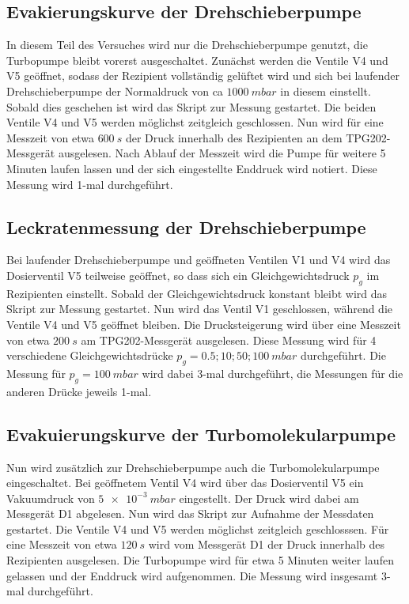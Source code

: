 \subsection{Evakierungskurve der Drehschieberpumpe}
In diesem Teil des Versuches wird nur die Drehschieberpumpe genutzt, die Turbopumpe bleibt vorerst ausgeschaltet.
Zunächst werden die Ventile V4 und V5 geöffnet, sodass der Rezipient vollständig gelüftet wird und sich bei laufender Drehschieberpumpe der Normaldruck von ca $\SI{1000}{mbar}$
in diesem einstellt.
Sobald dies geschehen ist wird das Skript zur Messung gestartet. Die beiden Ventile V4 und V5 werden möglichst zeitgleich geschlossen. Nun wird für eine Messzeit von etwa $\SI{600}{s}$
der Druck innerhalb des Rezipienten an dem TPG202-Messgerät ausgelesen. Nach Ablauf der Messzeit wird die Pumpe für weitere 5 Minuten laufen lassen und der sich eingestellte Enddruck
wird notiert. Diese Messung wird 1-mal durchgeführt.

\subsection{Leckratenmessung der Drehschieberpumpe}
Bei laufender Drehschieberpumpe und geöffneten Ventilen V1 und V4 wird das Dosierventil V5 teilweise geöffnet, so dass sich ein Gleichgewichtsdruck $p_{\mathit{g}}$ im Rezipienten einstellt.
Sobald der Gleichgewichtsdruck konstant bleibt wird das Skript zur Messung gestartet. Nun wird das Ventil V1 geschlossen, während die Ventile V4 und V5
geöffnet bleiben. Die Drucksteigerung wird über eine Messzeit von etwa $\SI{200}{s}$ am TPG202-Messgerät ausgelesen. Diese Messung wird für 4 verschiedene Gleichgewichtsdrücke
$p_{\mathit{g}} = 0.5; 10; 50; \SI{100}{mbar}$ durchgeführt. Die Messung für $p_{\mathit{g}} = \SI{100}{mbar}$ wird dabei 3-mal durchgeführt, die Messungen für die anderen Drücke jeweils 1-mal.

\subsection{Evakuierungskurve der Turbomolekularpumpe}
Nun wird zusätzlich zur Drehschieberpumpe auch die Turbomolekularpumpe eingeschaltet. Bei geöffnetem Ventil V4 wird über das Dosierventil V5 ein Vakuumdruck von $\SI{5e-3}{mbar}$ eingestellt.
Der Druck wird dabei am Messgerät D1 abgelesen.
Nun wird das Skript zur Aufnahme der Messdaten gestartet. Die Ventile V4 und V5 werden möglichst zeitgleich geschlosssen. Für eine Messzeit von etwa $\SI{120}{s}$ wird vom Messgerät
D1 der Druck innerhalb des Rezipienten ausgelesen. Die Turbopumpe wird für etwa 5 Minuten weiter laufen gelassen und der Enddruck wird aufgenommen.
Die Messung wird insgesamt 3-mal durchgeführt.

